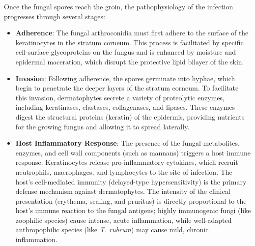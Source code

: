 Once the fungal spores reach the groin, the pathophysiology of the infection progresses through several stages:
\begin{itemize}
    \item \textbf{Adherence}: The fungal arthroconidia must first adhere to the surface of the keratinocytes in the stratum corneum. This process is facilitated by specific cell-surface glycoproteins on the fungus and is enhanced by moisture and epidermal maceration, which disrupt the protective lipid bilayer of the skin.
    \item \textbf{Invasion}: Following adherence, the spores germinate into hyphae, which begin to penetrate the deeper layers of the stratum corneum. To facilitate this invasion, dermatophytes secrete a variety of proteolytic enzymes, including keratinases, elastases, collagenases, and lipases. These enzymes digest the structural proteins (keratin) of the epidermis, providing nutrients for the growing fungus and allowing it to spread laterally.
    \item \textbf{Host Inflammatory Response}: The presence of the fungal metabolites, enzymes, and cell wall components (such as mannans) triggers a host immune response. Keratinocytes release pro-inflammatory cytokines, which recruit neutrophils, macrophages, and lymphocytes to the site of infection. The host's cell-mediated immunity (delayed-type hypersensitivity) is the primary defense mechanism against dermatophytes. The intensity of the clinical presentation (erythema, scaling, and pruritus) is directly proportional to the host's immune reaction to the fungal antigens; highly immunogenic fungi (like zoophilic species) cause intense, acute inflammation, while well-adapted anthropophilic species (like \textit{T. rubrum}) may cause mild, chronic inflammation.
\end{itemize}

